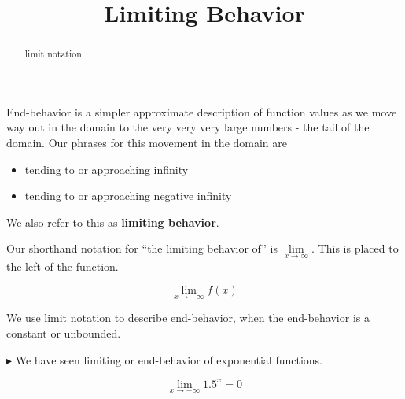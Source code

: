 \documentclass{ximera}
\title{Limiting Behavior}
\begin{document}
\begin{abstract}
limit notation
\end{abstract}
\maketitle




End-behavior is a simpler approximate description of function values as we move way out in the domain to the very very very large numbers - the tail of the domain.  Our phrases for this movement in the domain are 

\begin{itemize}
\item tending to or approaching infinity
\item tending to or approaching negative infinity
\end{itemize}


We also refer to this as \textbf{limiting behavior}. 


Our shorthand notation for ``the limiting behavior of'' is $\lim\limits_{x \to \infty}$.  This is placed to the left of the function. 


\[   \lim_{x \to -\infty} f(x)     \]



We use limit notation to describe end-behavior, when the end-behavior is a constant or unbounded.






$\blacktriangleright$  We have seen limiting or end-behavior of exponential functions.


\[   \lim_{x \to -\infty} 1.5^x   = 0      \]


\begin{image}
\end{image}
\end{document}
